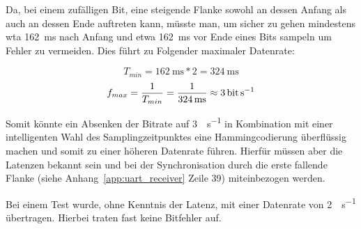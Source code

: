 \documentclass[12pt,a4paper]{article}
\begin{document}
Da, bei einem zufälligen Bit, eine steigende Flanke sowohl an dessen Anfang als auch an dessen Ende auftreten kann, müsste man, um sicher zu gehen mindestens wta \SI{162}{\milli\second} nach Anfang und etwa \SI{162}{\milli\second} vor Ende eines Bits sampeln um Fehler zu vermeiden. Dies führt zu Folgender maximaler Datenrate:

\begin{equation}
	T_{min} = \SI{162}{\milli\second} * 2 = \SI{324}{\milli\second}
\end{equation}
\begin{equation}
	f_{max} = \frac{1}{T_{min}} = \frac{1}{\SI{324}{\milli\second}} \approx \SI{3}{\bit\per\second}
\end{equation}

Somit könnte ein Absenken der Bitrate auf \SI{3}{\bit\per\second} in Kombination mit einer intelligenten Wahl des Samplingzeitpunktes eine Hammingcodierung überflüssig machen und somit zu einer höheren Datenrate führen. Hierfür müssen aber die Latenzen bekannt sein und bei der Synchronisation durch die erste fallende Flanke (siehe Anhang~\ref{app:uart_receiver} Zeile 39) miteinbezogen werden.

Bei einem Test wurde, ohne Kenntnis der Latenz, mit einer Datenrate von \SI{2}{\bit\per\second} übertragen. Hierbei traten fast keine Bitfehler auf.
\end{document}
